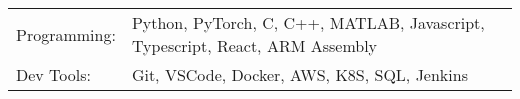 \begin{tabularx}{\linewidth}{@{}l X@{}}
Programming: &  \normalsize{Python, PyTorch, C, C++, MATLAB, Javascript, Typescript, React, ARM Assembly}\\
Dev Tools:  &  \normalsize{Git, VSCode, Docker, AWS, K8S, SQL, Jenkins}\\
\end{tabularx}